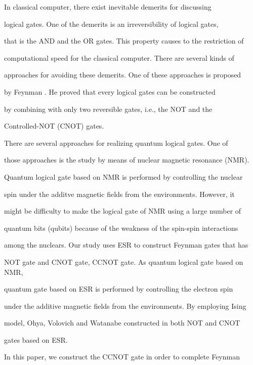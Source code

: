 \makeengtitlef



\smallskip




In classical computer, there exist inevitable demerits for discussing

logical gates. One of the demerits is an irreversibility of logical gates,

that is the AND and the OR gates. This property causes to the restriction of

computational speed for the classical computer. There are several kinds of

approaches for avoiding these demerits. One of these approaches is proposed

by Feynman \cite{mau:1}. He proved that every logical gates can be constructed

by combining with only two reversible gates, i.e., the NOT and the

Controlled-NOT (CNOT) gates.



There are several approaches for realizing quantum logical gates. One of

those approaches is the study by means of nuclear magnetic resonance (NMR).

Quantum logical gate based on NMR is performed by controlling the nuclear

spin under the additve magnetic fields from the environments. However, it

might be difficulty to make the logical gate of NMR using a large number of

quantum bits (qubits) because of the weakness of the spin-spin interactions

among the nuclears. Our study uses ESR to construct Feynman gates that has

NOT gate and CNOT gate, CCNOT gate. As quantum logical gate based on NMR,

quantum gate based on ESR is performed by controlling the electron spin

under the additive magnetic fields from the environments. By employing Ising

model, Ohya, Volovich and Watanabe constructed in \cite{mau:3} both NOT and CNOT

gates based on ESR.



In this paper, we construct the CCNOT gate in order to complete Feynman

